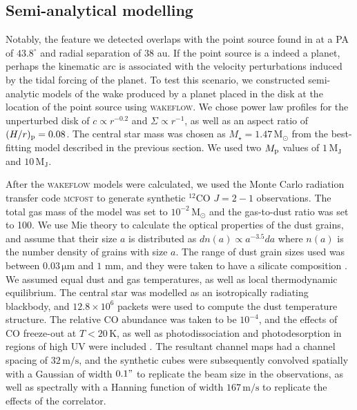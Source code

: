 \subsection{Semi-analytical modelling} \label{sec:garg_analytics}

Notably, the feature we detected overlaps with the point source found in \citet{gratton2019} at a PA of $43.8^\circ$ and radial separation of $38$ au.
If the point source is a indeed a planet, perhaps the kinematic arc is associated with the velocity perturbations induced by the tidal forcing of the planet.
To test this scenario, we constructed semi-analytic models of the wake produced by a planet placed in the disk at the location of the \citet{gratton2019} point source using \textsc{wakeflow}.
We chose power law profiles for the unperturbed disk of $c \propto r^{-0.2}$ and $\Sigma \propto r^{-1}$, as well as an aspect ratio of $(H/r)_{\rm p}=0.08$.
The central star mass was chosen as $M_\star = 1.47 \, \mathrm{M_\odot}$ from the best-fitting model described in the previous section.
We used two $M_{\rm p}$ values of $1 \, \mathrm{M_J}$ and $10 \, \mathrm{M_J}$.

After the \textsc{wakeflow} models were calculated, we used the Monte Carlo radiation transfer code \textsc{mcfost} \citep{pinte2006,pinte2009} to generate synthetic $^{12}$CO $J=2-1$ observations.
The total gas mass of the model was set to $10^{-2} \, \mathrm{M_\odot}$ \citep{toci2019} and the gas-to-dust ratio was set to 100.
We use Mie theory \citep{mie1908} to calculate the optical properties of the dust grains, and assume that their size $a$ is distributed as $dn(a) \propto a^{-3.5} da$ where $n(a)$ is the number density of grains with size $a$.
The range of dust grain sizes used was between $0.03 \, \mathrm{\mu m}$ and $1$ mm, and they were taken to have a silicate composition \citep{weingartner2001}.
We assumed equal dust and gas temperatures, as well as local thermodynamic equilibrium.
The central star was modelled as an isotropically radiating blackbody, and $12.8\times 10^6$ packets were used to compute the dust temperature structure.
The relative CO abundance was taken to be $10^{-4}$, and the effects of CO freeze-out at $T < 20\, \mathrm{K}$, as well as photodissociation and photodesorption in regions of high UV were included \citep{pinte2018}.
The resultant channel maps had a channel spacing of $32 \, \mathrm{m/s}$, and the synthetic cubes were subsequently convolved spatially with a Gaussian of width $0.1"$ to replicate the beam size in the observations, as well as spectrally with a Hanning function of width $167 \, \mathrm{m/s}$ to replicate the effects of the correlator.


